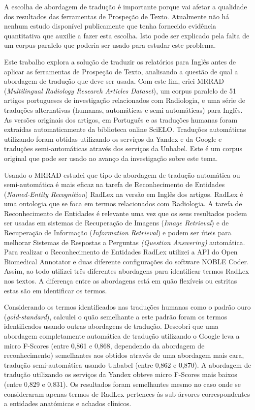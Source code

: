 \begin{abstractspt}
A escolha de abordagem de tradução é importante porque vai afetar a qualidade dos resultados das ferramentas de Prospeção de Texto. Atualmente não há nenhum estudo disponível publicamente que tenha fornecido evidência quantitativa que auxilie a fazer esta escolha. Isto pode ser explicado pela falta de um corpus paralelo que poderia ser usado para estudar este problema. 

Este trabalho explora a solução de traduzir os relatórios para Inglês antes de aplicar as ferramentas de Prospeção de Texto, analisando a questão de qual a abordagem de tradução que deve ser usada. Com este fim, criei MRRAD (\textit{Multilingual Radiology Research Articles Dataset}), um corpus paralelo de 51 artigos portugueses de investigação relacionados com Radiologia, e uma série de traduções alternativas (humanas, automáticas e semi-automáticas) para Inglês. As versões originais dos artigos, em Português e as traduções humanas foram extraídas automaticamente da biblioteca online SciELO. Traduções automáticas utilizando foram obtidas utilizando os serviços da Yandex e da Google e traduções semi-automáticas através dos serviços da Unbabel. Este é um corpus original que pode ser usado no avanço da investigação sobre este tema.

Usando o MRRAD estudei que tipo de abordagem de tradução automática ou semi-automática é mais eficaz na tarefa de Reconhecimento de Entidades (\textit{Named-Entity Recognition}) RadLex na versão em Inglês dos artigos. RadLex é uma ontologia que se foca em termos relacionados com Radiologia. A tarefa de Reconhecimento de Entidades é relevante uma vez que os seus resultados podem ser usadas em sistemas de Recuperação de Imagens (\textit{Image Retrieval}) e de Recuperação de Informação (\textit{Information Retrieval}) e podem ser úteis para melhorar Sistemas de Respostas a Perguntas \textit{(Question Answering)} automática. Para realizar o Reconhecimento de Entidades RadLex utilizei a API do Open Biomedical Annotator e duas diferente configurações do software NOBLE Coder. Assim, ao todo utilizei três diferentes abordagens para identificar termos RadLex nos textos. A diferença entre as abordagens está em quão flexíveis ou estritas estas são em identificar os termos. 

Considerando os termos identificados nas traduções humanas como o padrão ouro (\textit{gold-standard}), calculei o quão semelhante a este padrão foram os termos identificados usando outras abordagens de tradução. Descobri que uma abordagem completamente automática de tradução utilizando o Google leva a micro F-Scores (entre 0,861 e 0,868, dependendo da abordagem de reconhecimento) semelhantes aos obtidos através de uma abordagem mais cara, tradução semi-automática usando Unbabel (entre 0,862 e 0,870). A abordagem de tradução utilizando os serviços da Yandex obteve micro F-Scores mais baixos (entre 0,829 e 0,831). Os resultados foram semelhantes mesmo no caso onde se consideraram apenas termos de RadLex pertences às sub-árvores correspondentes a entidades anatómicas e achados clínicos. 


\end{abstractspt}
